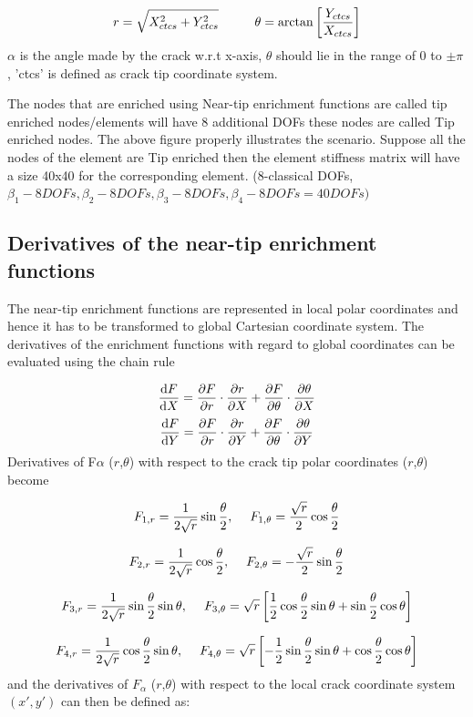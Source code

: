 \documentclass[fleqn, 12.5pt,a4paper]{report}
\newcommand\tab[1][1cm]{\hspace*{#1}}
\begin{document}
$$r = \sqrt{X_{ctcs}^2 + Y_{ctcs}^2} \tab \theta = \arctan\left[\frac{Y_{ctcs}}{X_{ctcs}}\right]
$$
$\alpha$ is the angle made by the crack w.r.t x-axis, $\theta$ should lie in the range of $0$ to $\pm \pi$, 'ctcs' is defined as crack tip coordinate system.\par
The nodes that are enriched using Near-tip enrichment functions are called tip enriched nodes/elements will have 8 additional DOFs these nodes are called Tip enriched nodes. The above figure properly illustrates the scenario. Suppose all the nodes of the element are Tip enriched then the element stiffness matrix will have a size 40x40 for the corresponding element. (8-classical DOFs, $\beta_1- 8 DOFs, \beta_2- 8 DOFs, \beta_3- 8 DOFs, \beta_4- 8 DOFs = 40 DOFs)$

\subsection{\color{Black} {Derivatives of the near-tip enrichment functions}}
The near-tip enrichment functions are represented in local polar coordinates and hence it has to be transformed to global Cartesian coordinate system. The derivatives of the enrichment functions with regard to global coordinates can be evaluated using the chain rule \cite{mohammadi2008extended} 

$$\dv{F}{X} = \pdv{F}{r} \cdot \pdv{r}{X} + \pdv{F}{\theta} \cdot \pdv{\theta}{X}$$
$$\dv{F}{Y} = \pdv{F}{r} \cdot \pdv{r}{Y} + \pdv{F}{\theta} \cdot \pdv{\theta}{Y}$$ 
Derivatives of F$\alpha$ ($r$,$\theta$) with respect to the crack tip polar coordinates ($r$,$\theta$) become

$$F_{1,r} = \frac{1}{2\sqrt r} \sin\frac{\theta}{2}, \tab[0.45cm] F_{1,\theta} = \frac{\sqrt r}{2} \cos\frac{\theta}{2}$$

$$F_{2,r} = \frac{1}{2\sqrt r} \cos\frac{\theta}{2}, \tab[0.45cm] F_{2,\theta} = -\frac{\sqrt r}{2} \sin\frac{\theta}{2}$$

$$F_{3,r} = \frac{1}{2\sqrt r} \sin\frac{\theta}{2} \sin\theta, \tab[0.45cm] F_{3,\theta} = \sqrt r \left[\frac{1}{2}\cos\frac{\theta}{2} \sin\theta + \sin\frac{\theta}{2} \cos\theta \right]$$

$$F_{4,r} = \frac{1}{2\sqrt r} \cos\frac{\theta}{2} \sin\theta, \tab[0.45cm] F_{4,\theta} = \sqrt r \left[-\frac{1}{2}\sin\frac{\theta}{2} \sin\theta + \cos\frac{\theta}{2} \cos\theta \right]$$
\newline
and the derivatives of {$F_\alpha$} ($r$,$\theta$)\cite{mohammadi2008extended} with respect to the local crack coordinate system $(x', y')$ can then be defined as:
\end{document}
